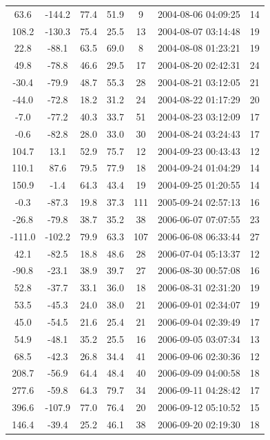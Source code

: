 \documentclass[12pt,a4paper]{report}
\begin{document}
\begin{longtable}{|c|c|c|c|c|c|c|}
63.6 & -144.2 & 77.4 & 51.9 &   9 & 2004-08-06 04:09:25 &  14 \\
108.2 & -130.3 & 75.4 & 25.5 &  13 & 2004-08-07 03:14:48 &  19 \\
22.8 & -88.1 & 63.5 & 69.0 &   8 & 2004-08-08 01:23:21 &  19 \\
49.8 & -78.8 & 46.6 & 29.5 &  17 & 2004-08-20 02:42:31 &  24 \\
-30.4 & -79.9 & 48.7 & 55.3 &  28 & 2004-08-21 03:12:05 &  21 \\
-44.0 & -72.8 & 18.2 & 31.2 &  24 & 2004-08-22 01:17:29 &  20 \\
-7.0 & -77.2 & 40.3 & 33.7 &  51 & 2004-08-23 03:12:09 &  17 \\
-0.6 & -82.8 & 28.0 & 33.0 &  30 & 2004-08-24 03:24:43 &  17 \\
104.7 & 13.1 & 52.9 & 75.7 &  12 & 2004-09-23 00:43:43 &  12 \\
110.1 & 87.6 & 79.5 & 77.9 &  18 & 2004-09-24 01:04:29 &  14 \\
150.9 & -1.4 & 64.3 & 43.4 &  19 & 2004-09-25 01:20:55 &  14 \\
-0.3 & -87.3 & 19.8 & 37.3 & 111 & 2005-09-24 02:57:13 &  16 \\
-26.8 & -79.8 & 38.7 & 35.2 &  38 & 2006-06-07 07:07:55 &  23 \\
-111.0 & -102.2 & 79.9 & 63.3 & 107 & 2006-06-08 06:33:44 &  27 \\
42.1 & -82.5 & 18.8 & 48.6 &  28 & 2006-07-04 05:13:37 &  12 \\
-90.8 & -23.1 & 38.9 & 39.7 &  27 & 2006-08-30 00:57:08 &  16 \\
52.8 & -37.7 & 33.1 & 36.0 &  18 & 2006-08-31 02:31:20 &  19 \\
53.5 & -45.3 & 24.0 & 38.0 &  21 & 2006-09-01 02:34:07 &  19 \\
45.0 & -54.5 & 21.6 & 25.4 &  21 & 2006-09-04 02:39:49 &  17 \\
54.9 & -48.1 & 35.2 & 25.5 &  16 & 2006-09-05 03:07:34 &  13 \\
68.5 & -42.3 & 26.8 & 34.4 &  41 & 2006-09-06 02:30:36 &  12 \\
208.7 & -56.9 & 64.4 & 48.4 &  40 & 2006-09-09 04:00:58 &  18 \\
277.6 & -59.8 & 64.3 & 79.7 &  34 & 2006-09-11 04:28:42 &  17 \\
396.6 & -107.9 & 77.0 & 76.4 &  20 & 2006-09-12 05:10:52 &  15 \\
146.4 & -39.4 & 25.2 & 46.1 &  38 & 2006-09-20 02:19:30 &  18 \\

\end{longtable}
\end{document}
